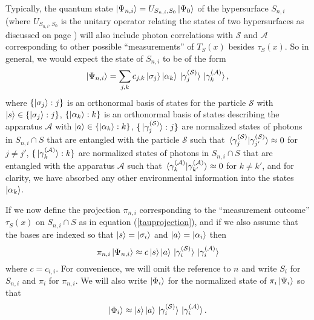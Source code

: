 Typically, the quantum state $\ket{\Psi_{n,i}}=U_{S_{n,i},S_0}\ket{\Psi_0}$ of the hypersurface $S_{n,i}$ (where  $U_{S_{n,i},S_0}$ is the unitary operator relating the states of two hypersurfaces as discussed on page \pageref{SchwingerUnitaryOP}) will also include photon correlations with $\mathcal{S}$ and $\mathcal{A}$ corresponding to other possible ``measurements'' of $T_S(x)$ besides $\tau_S(x)$. So in general, we would expect the state of $S_{n,i}$ to be of the form
$$ \ket{\Psi_{n,i}}=\sum_{j,k}c_{j,k}\ket{\sigma_j}\ket{\alpha_k}\ket*{\gamma_j^{(\mathcal{S})}}\ket*{\gamma_k^{(\mathcal{A})}},$$
where $\{\ket{\sigma_j}:j\}$ 
is an orthonormal basis of states for the particle $\mathcal{S}$ with $\ket{s}\in\{\ket{\sigma_j}:j\}$,   $\{\ket{\alpha_k}:k\}$ 
is an orthonormal basis of states describing the apparatus $\mathcal{A}$ with $\ket{a}\in\{\ket{\alpha_k}:k\}$,  $\{\ket*{\gamma_j^{(\mathcal{S})}}:j\}$ 
are normalized states of photons in $S_{n,i}\cap S$ that are entangled with the particle $\mathcal{S}$ such that $\ip*{\gamma_j^{(\mathcal{S})}}{\gamma_{j'}^{(\mathcal{S})}}\approx 0$ for $j\neq j'$,   $\{\ket*{\gamma_k^{(\mathcal{A})}}:k\}$  are normalized states of photons in $S_{n,i}\cap S$ that are entangled with the apparatus $\mathcal{A}$ such that $\ip*{\gamma_k^{(\mathcal{A})}}{\gamma_{k'}^{(\mathcal{A})}}\approx 0$ for $k\neq k'$, and for clarity, we have absorbed any other environmental information into the states $\ket{\alpha_k}$. 

If we now define the projection $\pi_{n,i}$ corresponding to the ``measurement outcome''  $\tau_S(x)$ on $S_{n,i}\cap S$ as in equation (\ref{tauprojection}), and if we also assume that the bases are indexed so that $\ket{s}=\ket{\sigma_i}$
 and $\ket{a}=\ket{\alpha_i}$ then
\begin{equation}\label{piphi}
	\pi_{n,i}\ket{\Psi_{n,i}}\approx c\ket{s}\ket{a}\ket*{\gamma_i^{(\mathcal{S})}}\ket*{\gamma_i^{(\mathcal{A})}}
\end{equation}
 where $c=c_{i,i}$. For convenience, we will omit the reference to $n$ and write $S_i$ for $S_{n,i}$ and $\pi_i$ for $\pi_{n,i}$. We will also write $\ket{\Phi_i}$ for the normalized state of $\pi_i\ket{\Psi_i}$ so that 
 $$\ket{\Phi_i}\approx \ket{s}\ket{a}\ket*{\gamma_i^{(\mathcal{S})}}\ket*{\gamma_i^{(\mathcal{A})}}.$$

